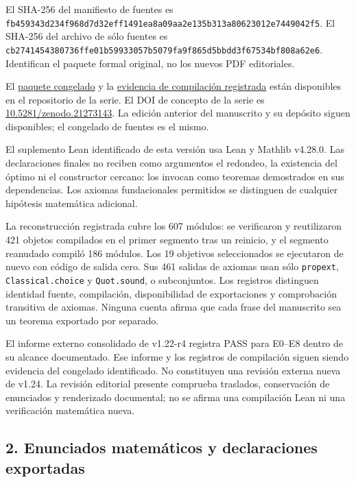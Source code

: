 \documentclass[spanish,11pt,a4paper]{article}
\begin{document}
El SHA-256 del manifiesto de fuentes es
\nolinkurl{fb459343d234f968d7d32eff1491ea8a09aa2e135b313a80623012e7449042f5}.
El SHA-256 del archivo de sólo fuentes es
\nolinkurl{cb2741454380736ffe01b59933057b5079fa9f865d5bbdd3f67534bf808a62e6}.
Identifican el paquete formal original, no los nuevos PDF editoriales.

El
\href{https://github.com/jtraverso/erdos-81-chordal-clique-partitions/tree/ef31294ad67dfe3f44bc47cec4791c836f55e8aa/preprints/PAPER_IV/05_formalization}{paquete
congelado} y la
\href{https://github.com/jtraverso/erdos-81-chordal-clique-partitions/tree/ef31294ad67dfe3f44bc47cec4791c836f55e8aa/preprints/PAPER_IV/03_reproducibility}{evidencia
de compilación registrada} están disponibles en el repositorio de la
serie. El DOI de concepto de la serie es
\href{https://doi.org/10.5281/zenodo.21273143}{10.5281/zenodo.21273143}.
La edición anterior del manuscrito y su depósito siguen disponibles; el
congelado de fuentes es el mismo.

El suplemento Lean identificado de esta versión usa Lean y Mathlib
v4.28.0. Las declaraciones finales no reciben como argumentos el
redondeo, la existencia del óptimo ni el constructor cercano: los
invocan como teoremas demostrados en sus dependencias. Los axiomas
fundacionales permitidos se distinguen de cualquier hipótesis matemática
adicional.

La reconstrucción registrada cubre los 607 módulos: se verificaron y
reutilizaron 421 objetos compilados en el primer segmento tras un
reinicio, y el segmento reanudado compiló 186 módulos. Los 19 objetivos
seleccionados se ejecutaron de nuevo con código de salida cero. Sus 461
salidas de axiomas usan sólo \nolinkurl{propext}, \nolinkurl{Classical.choice}
y \nolinkurl{Quot.sound}, o subconjuntos. Los registros distinguen
identidad fuente, compilación, disponibilidad de exportaciones y
comprobación transitiva de axiomas. Ninguna cuenta afirma que cada frase
del manuscrito sea un teorema exportado por separado.

El informe externo consolidado de v1.22-r4 registra PASS para E0--E8
dentro de su alcance documentado. Ese informe y los registros de
compilación siguen siendo evidencia del congelado identificado. No
constituyen una revisión externa nueva de v1.24. La revisión editorial
presente comprueba traslados, conservación de enunciados y renderizado
documental; no se afirma una compilación Lean ni una verificación
matemática nueva.

\subsection{2. Enunciados matemáticos y declaraciones
exportadas}\label{enunciados-matemuxe1ticos-y-declaraciones-exportadas}
\end{document}
